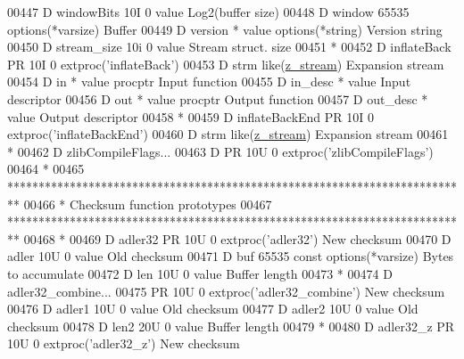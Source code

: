 \begin{DoxyCode}
00447      D  windowBits                   10I 0 value                                Log2(buffer size)
00448      D  window                    65535    options(*varsize)                    Buffer
00449      D  version                        *   value options(*\textcolor{keywordtype}{string})               Version \textcolor{keywordtype}{string}
00450      D  stream\_size                  10i 0 value                                Stream struct. size
00451       *
00452      D inflateBack     PR            10I 0 extproc('inflateBack')
00453      D  strm                               like(\hyperlink{structz__stream__s}{z\_stream})                       Expansion stream
00454      D  in                             *   value procptr                        Input function
00455      D  in\_desc                        *   value                                Input descriptor
00456      D  out                            *   value procptr                        Output function
00457      D  out\_desc                       *   value                                Output descriptor
00458       *
00459      D inflateBackEnd  PR            10I 0 extproc('inflateBackEnd')
00460      D  strm                               like(\hyperlink{structz__stream__s}{z\_stream})                       Expansion stream
00461       *
00462      D zlibCompileFlags...
00463      D                 PR            10U 0 extproc('zlibCompileFlags')
00464       *
00465       **************************************************************************
00466       *                        Checksum function prototypes
00467       **************************************************************************
00468       *
00469      D adler32         PR            10U 0 extproc('adler32')                   New checksum
00470      D  adler                        10U 0 value                                Old checksum
00471      D  buf                       65535    const options(*varsize)              Bytes to accumulate
00472      D  len                          10U 0 value                                Buffer length
00473       *
00474      D adler32\_combine...
00475                        PR            10U 0 extproc('adler32\_combine')           New checksum
00476      D  adler1                       10U 0 value                                Old checksum
00477      D  adler2                       10U 0 value                                Old checksum
00478      D  len2                         20U 0 value                                Buffer length
00479       *
00480      D adler32\_z       PR            10U 0 extproc('adler32\_z')                 New checksum

\end{DoxyCode}
